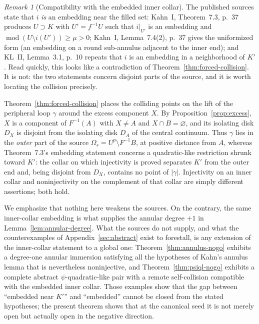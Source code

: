 \documentclass[11pt,reqno]{amsart}
\theoremstyle{definition}
\theoremstyle{remark}
\newtheorem{remark}[theorem]{Remark}
\begin{document}
\begin{remark}[Compatibility with the embedded inner collar]
\label{rem:collar-compat}
The published sources state that \(i\) \emph{is} an embedding near the
filled set: Kahn~I, Theorem~7.3, p.~37 produces \(U\supset K\) with
\(U'=f^{-1}U\) such that \(i|_{U'}\) is an embedding and
\(\operatorname{mod}(U\setminus i(U'))\ge\mu>0\); Kahn~I,
Lemma~7.4(2), p.~37 gives the uniformized form (an embedding on a round
sub-annulus adjacent to the inner end); and KL~II, Lemma~3.1, p.~10
repeats that \(i\) is an embedding in a neighborhood of \(K'\).  Read
quickly, this looks like a contradiction of
Theorem~\ref{thm:forced-collision}.  It is not: the two statements
concern disjoint parts of the source, and it is worth locating the
collision precisely.

Theorem~\ref{thm:forced-collision} places the colliding points on the
lift of the peripheral loop \(\gamma\) around the excess component
\(X\).  By Proposition~\ref{prop:excess}, \(X\) is a component of
\(F^{-1}(A)\) with \(X\neq A\) and \(X\cap B=\varnothing\), and its
isolating disk \(D_X\) is disjoint from the isolating disk \(D_A\) of
the central continuum.  Thus \(\gamma\) lies in the \emph{outer} part
of the source \(\Omega_s=U^{p}\setminus F^{-1}B\), at positive
distance from \(A\), whereas Theorem~7.3's embedding statement
concerns a quadratic-like restriction shrunk toward \(K'\): the
collar on which injectivity is proved separates \(K'\) from the outer
end and, being disjoint from \(D_X\), contains no point of
\(|\gamma|\).  Injectivity on an inner collar and noninjectivity on
the complement of that collar are simply different assertions; both
hold.

We emphasize that nothing here weakens the sources.  On the contrary,
the same inner-collar embedding is what supplies the annular degree
\(+1\) in Lemma~\ref{lem:annular-degree}.  What the sources do not
supply, and what the counterexamples of
Appendix~\ref{sec:abstract} exist to forestall, is any extension of
the inner-collar statement to a global one: Theorem~\ref{thm:annulus-nogo}
exhibits a degree-one annular immersion satisfying all the hypotheses
of Kahn's annulus lemma that is nevertheless noninjective, and
Theorem~\ref{thm:psiql-nogo} exhibits a complete abstract
\(\psi\)-quadratic-like pair with a remote self-collision compatible
with the embedded inner collar.  Those examples show that the gap
between ``embedded near \(K'\)'' and ``embedded'' cannot be closed
from the stated hypotheses; the present theorem shows that at the
canonical seed it is not merely open but actually open in the
negative direction.
\end{remark}
\end{document}
